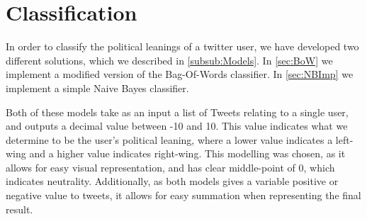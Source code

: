 \chapter{Classification}\label{cha:classification}

In order to classify the political leanings of a twitter user, we have developed
two different solutions, which we described in \autoref{subsub:Models}. In
\autoref{sec:BoW} we implement a modified version of the Bag-Of-Words
classifier. In \autoref{sec:NBImp} we implement a simple Naive Bayes
classifier.\nl

Both of these models take as an input a list of Tweets relating to a single
user, and outputs a decimal value between -10 and 10. This value indicates
what we determine to be the user's political leaning, where a lower value
indicates a left-wing and a higher value indicates right-wing. This modelling
was chosen, as it allows for easy visual representation, and has clear
middle-point of 0, which indicates neutrality. Additionally, as both
models gives a variable positive or negative value to tweets, it allows for easy
summation when representing the final result.
